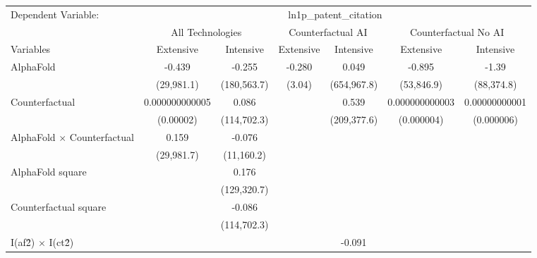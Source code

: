 \begingroup
\centering
\begin{tabular}{lcccccc}
   \tabularnewline \midrule \midrule
   Dependent Variable: & \multicolumn{6}{c}{ln1p\_patent\_citation}\\
 & \multicolumn{2}{c}{All Technologies} & \multicolumn{2}{c}{Counterfactual AI} & \multicolumn{2}{c}{Counterfactual No AI} \\
\cmidrule(lr){1-1}\cmidrule(lr){2-3} \cmidrule(lr){4-5} \cmidrule(lr){6-7}
Variables & \multicolumn{1}{c}{Extensive} & \multicolumn{1}{c}{Intensive} & \multicolumn{1}{c}{Extensive} & \multicolumn{1}{c}{Intensive} & \multicolumn{1}{c}{Extensive} & \multicolumn{1}{c}{Intensive} \\
\cmidrule(lr){1-1}\cmidrule(lr){2-2} \cmidrule(lr){3-3} \cmidrule(lr){4-4} \cmidrule(lr){5-5} \cmidrule(lr){6-6} \cmidrule(lr){7-7}
   AlphaFold                          & -0.439         & -0.255      & -0.280 & 0.049       & -0.895         & -1.39\\   
                                      & (29,981.1)     & (180,563.7) & (3.04) & (654,967.8) & (53,846.9)     & (88,374.8)\\   
   Counterfactual                     & 0.000000000005 & 0.086       &        & 0.539       & 0.000000000003 & 0.00000000001\\   
                                      & (0.00002)      & (114,702.3) &        & (209,377.6) & (0.000004)     & (0.000006)\\   
   AlphaFold $\times$ Counterfactual  & 0.159          & -0.076      &        &             &                &   \\   
                                      & (29,981.7)     & (11,160.2)  &        &             &                &   \\   
   AlphaFold square                   &                & 0.176       &        &             &                &   \\   
                                      &                & (129,320.7) &        &             &                &   \\   
   Counterfactual square              &                & -0.086      &        &             &                &   \\   
                                      &                & (114,702.3) &        &             &                &   \\   
   I(af\^2) $\times$ I(ct\^2)         &                &             &        & -0.091      &                &   \\   

\end{tabular}
